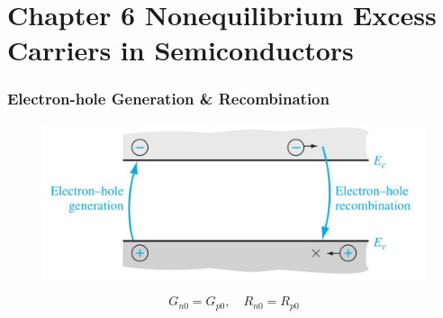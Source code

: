 \documentclass{beamer}
\begin{document}
\section{Chapter 6 Nonequilibrium Excess Carriers in Semiconductors}
    \begin{frame} \frametitle{Electron-hole Generation \& Recombination}
        \begin{figure}[H]
            \centering
            \includegraphics[width=0.6\linewidth]{Generation-recombination.jpg}
            \label{fig:Generation-recombination.jpg}
        \end{figure}
        \begin{equation*}
            G_{n0} = G_{p0}, \quad R_{n0} = R_{p0}
        \end{equation*}
    \end{frame}
\end{document}
